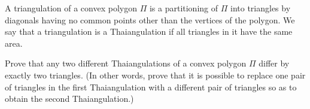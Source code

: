 A 
triangulation
 of a convex polygon 
$\Pi$
 is a partitioning of 
$\Pi$
 into triangles by diagonals having no common points other than the vertices of the polygon. We say that a triangulation is a 
Thaiangulation
 if all triangles in it have the same area.


Prove that any two different Thaiangulations of a convex polygon 
$\Pi$
 differ by exactly two triangles. (In other words, prove that it is possible to replace one pair of triangles in the first Thaiangulation with a different pair of triangles so as to obtain the second Thaiangulation.)
